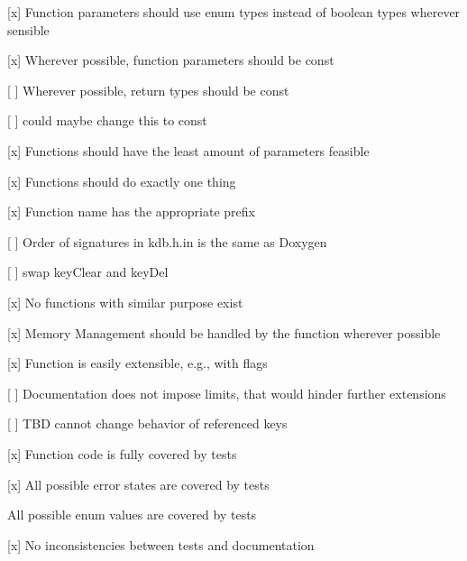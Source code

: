 \begin{DoxyItemize}
\item \mbox{[}x\mbox{]} Function parameters should use enum types instead of boolean types wherever sensible
\item \mbox{[}x\mbox{]} Wherever possible, function parameters should be {\ttfamily const}
\item \mbox{[} \mbox{]} Wherever possible, return types should be {\ttfamily const}
\begin{DoxyItemize}
\item \mbox{[} \mbox{]} could maybe change this to const
\end{DoxyItemize}
\item \mbox{[}x\mbox{]} Functions should have the least amount of parameters feasible
\end{DoxyItemize}


\begin{DoxyItemize}
\item \mbox{[}x\mbox{]} Functions should do exactly one thing
\item \mbox{[}x\mbox{]} Function name has the appropriate prefix
\item \mbox{[} \mbox{]} Order of signatures in kdb.\+h.\+in is the same as Doxygen
\begin{DoxyItemize}
\item \mbox{[} \mbox{]} swap key\+Clear and key\+Del
\end{DoxyItemize}
\item \mbox{[}x\mbox{]} No functions with similar purpose exist
\end{DoxyItemize}


\begin{DoxyItemize}
\item \mbox{[}x\mbox{]} Memory Management should be handled by the function wherever possible
\end{DoxyItemize}


\begin{DoxyItemize}
\item \mbox{[}x\mbox{]} Function is easily extensible, e.\+g., with flags
\item \mbox{[} \mbox{]} Documentation does not impose limits, that would hinder further extensions
\begin{DoxyItemize}
\item \mbox{[} \mbox{]} T\+BD cannot change behavior of referenced keys
\end{DoxyItemize}
\end{DoxyItemize}


\begin{DoxyItemize}
\item \mbox{[}x\mbox{]} Function code is fully covered by tests
\item \mbox{[}x\mbox{]} All possible error states are covered by tests
\item All possible enum values are covered by tests
\item \mbox{[}x\mbox{]} No inconsistencies between tests and documentation
\end{DoxyItemize}